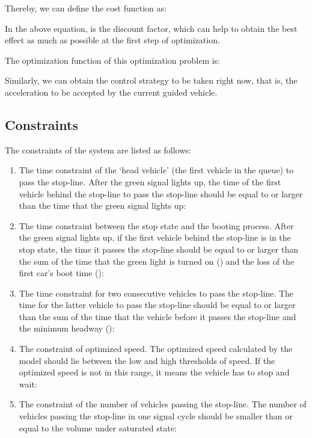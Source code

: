 \documentclass[10.5pt,compsoc]{TsT}
\theoremstyle{mystyle}
\renewcommand{\labelenumi}{(\arabic{enumi})}
\begin{document}
{Thereby, we can define the cost function as:

In the above equation, is the discount factor, which can help to obtain
the best effect as much as possible at the first step of optimization.

The optimization function of this optimization problem is:

Similarly, we can obtain the control strategy to be taken right now,
that is, the acceleration to be accepted by the current guided vehicle.

\subsection{Constraints}


The constraints of the system are listed as follows:

\begin{enumerate}
\def\labelenumi{\alph{enumi})}
\item
  The time constraint of the `head vehicle' (the first vehicle in the
  queue) to pass the stop-line. After the green signal lights up, the
  time of the first vehicle behind the stop-line to pass the stop-line
  should be equal to or larger than the time that the green signal
  lights up:
\item
  The time constraint between the stop state and the booting process.
  After the green signal lights up, if the first vehicle behind the
  stop-line is in the stop state, the time it passes the stop-line
  should be equal to or larger than the sum of the time that the green
  light is turned on () and the loss of the first car's boot time ():
\item
  The time constraint for two consecutive vehicles to pass the
  stop-line. The time for the latter vehicle to pass the stop-line
  should be equal to or larger than the sum of the time that the vehicle
  before it passes the stop-line and the minimum headway ():
\item
  The constraint of optimized speed. The optimized speed calculated by
  the model should lie between the low and high thresholds of speed. If
  the optimized speed is not in this range, it means the vehicle has to
  stop and wait:
\item
  The constraint of the number of vehicles passing the stop-line. The
  number of vehicles passing the stop-line in one signal cycle should be
  smaller than or equal to the volume under saturated state:
\end{enumerate}

}
\end{document}
